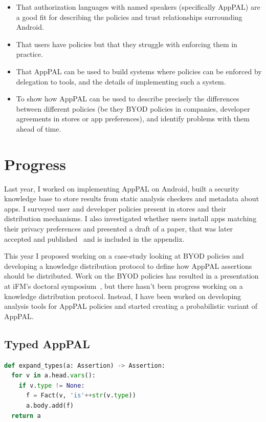 \documentclass[a4paper]{scrartcl}
\begin{document}
\begin{itemize}
\item That authorization languages with named speakers (specifically AppPAL) are
  a good fit for describing the policies and trust relationships surrounding
  Android.
\item That users have policies but that they struggle with enforcing them in
  practice.
\item That AppPAL can be used to build systems where policies can be
  enforced by delegation to tools, and the details of implementing such a system.
\item To show how AppPAL can be used to describe precisely the differences
  between different policies (be they BYOD policies in companies, developer
  agreements in stores or app preferences), and identify problems
  with them ahead of time.
\end{itemize}

\section{Progress}
\label{sec:work}

Last year, I worked on implementing AppPAL on Android, built a security
knowledge base to store results from static analysis checkers and metadata about
apps. I surveyed user and developer policies present in stores and
their distribution mechanisms. I also investigated whether users install apps
matching their privacy preferences and presented a draft of a paper, that was
later accepted and published~\cite{hallett_apppal_2016} and is included in the appendix.

This year I proposed working on a case-study looking at BYOD policies and
developing a knowledge distribution protocol to define how AppPAL assertions
should be distributed.  Work on the BYOD policies has resulted in a presentation
at iFM's doctoral symposium~\cite{hallett_specifying_2016}, but there hasn't
been progress working on a knowledge distribution protocol.  Instead, I have been
worked on developing analysis tools for AppPAL policies and started creating a
probabilistic variant of AppPAL.

\subsection{Typed AppPAL}
\label{sec:types}

\begin{lstlisting}[language=Python, float, caption={Procedure used to expand types from AppPAL into SecPAL.}]
def expand_types(a: Assertion) -> Assertion:
  for v in a.head.vars():
    if v.type != None:
      f = Fact(v, 'is'++str(v.type))
      a.body.add(f)
  return a
\end{lstlisting}
\end{document}
